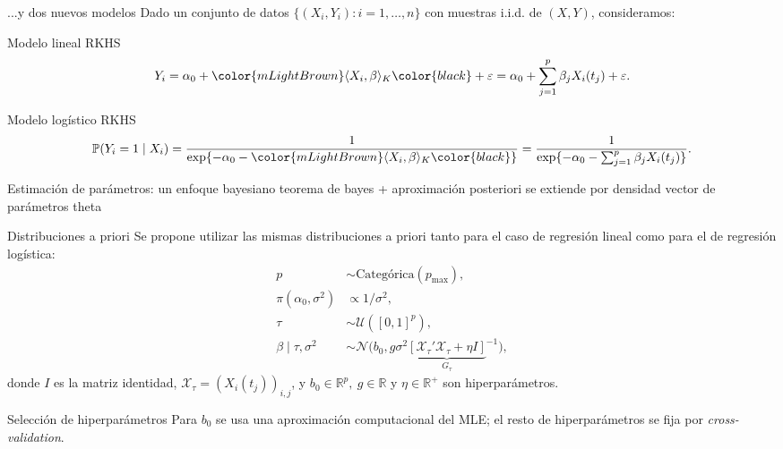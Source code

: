 \documentclass[10pt, spanish, professionalfonts]{beamer}
\newcommand\maroon[1]{\color{mLightBrown}#1\color{black}}
\newcommand{\R}{\mathbb{R}}
\begin{document}
\begin{frame}{...y dos nuevos modelos}
  Dado un conjunto de datos \(\{(X_i, Y_i): i=1,\dots, n\}\) con muestras i.i.d. de \((X, Y)\), consideramos:

  \vspace{1em}

  \begin{block}{Modelo lineal RKHS}
  \[
    Y_i = \alpha_0 + \maroon{\langle X_i, \beta \rangle_K} + \varepsilon = \alpha_0 + \sum_{j=1}^p \beta_j X_i(t_j) + \varepsilon.
  \]
\end{block}
\begin{block}{Modelo logístico RKHS}
    \[
    \mathbb P (Y_i=1\mid X_i) = \frac{1}{\exp\{-\alpha_0 - \maroon{\langle X_i, \beta\rangle_K}\}} = \frac{1}{\exp\{-\alpha_0 - \sum_{j=1}^p \beta_j X_i(t_j)\}}.
  \]
\end{block}
\end{frame}

\begin{frame}{Estimación de parámetros: un enfoque bayesiano}
  teorema de bayes + aproximación posteriori
  se extiende por densidad
  vector de parámetros theta
\end{frame}

\begin{frame}{Distribuciones a priori}
  Se propone utilizar las mismas distribuciones a priori tanto para el caso de regresión lineal como para el de regresión logística:
  \begin{align*}
    p &\sim \text{Categórica}(p_{\text{max}}),\\
  \pi(\alpha_0, \sigma^2)              & \propto 1/\sigma^2,                                                     \\
  \tau                     & \sim \mathcal U([0, 1]^p),                                              \\
  \beta\mid \tau, \sigma^2 & \sim \mathcal N\big(b_0, g\sigma^2{\underbrace{\left[\mathcal X_\tau' \mathcal X_\tau + \eta I\right]}_{G_\tau}}^{-1}\big),
\end{align*}
donde \(I\) es la matriz identidad, \(\mathcal X_\tau = (X_i(t_j))_{i,j}\), y \(b_0\in \R^p, \ g \in \R\) y \(\eta \in \R^+\) son hiperparámetros.

\begin{alertblock}{Selección de hiperparámetros}
  \vspace{0.1em}
  Para \(b_0\) se usa una aproximación computacional del MLE; el resto de hiperparámetros se fija por \textit{cross-validation}.
\end{alertblock}
\end{frame}
\end{document}
